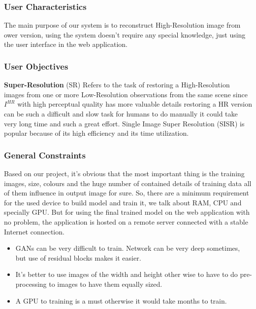 \documentclass[12pt]{article}
\begin{document}
			\subsubsection{User Characteristics}
				The main purpose of our system is to reconstruct High-Resolution image from ower version, using the system doesn’t require any special knowledge, just using the user interface in the web application.
			\subsubsection{User Objectives}
				\textbf{Super-Resolution} (SR) Refers to the task of restoring a High-Resolution images from one or more Low-Resolution observations from the same scene since $I^{HR}$ with high perceptual quality has more valuable details restoring a HR version can be such a difficult and slow task for humans to do manually it could take very long time and such a great effort. Single Image Super Resolution (SISR) is popular because of its high efficiency and its time utilization.
			\subsubsection{General Constraints}
				Based on our project, it’s obvious that the most important thing is the training images, size, colours and the huge number of contained details of training data all of them influence in output image for sure. So, there are a minimum requirement for the used device to build model and train it, we talk about RAM, CPU and specially GPU. But for using the final trained model on the web application with no problem, the application is hosted on a remote server connected with a stable Internet connection.
				\begin{itemize}
					\item GANs can be very difficult to train. Network can be very deep sometimes, but use of residual blocks makes it easier.
					\item It’s better to use images of the width and height other wise to have to do pre-processing to images to have them equally sized.
					\item A GPU to training is a must otherwise it would take months to train.
				\end{itemize}
		\clearpage
\end{document}
